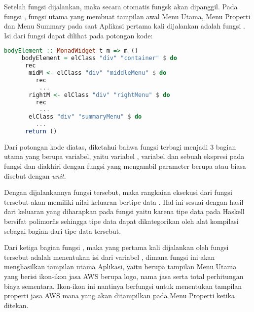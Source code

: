\documentclass[pi.tex]{subfile}
\begin{document}
   \hspace{5pt}Setelah fungsi  dijalankan, maka secara otomatis fungsk  akan dipanggil. Pada fungsi , fungsi utama yang membuat tampilan awal Menu Utama, Menu Properti dan Menu Summary pada saat Aplikasi pertama kali dijalankan adalah fungsi . Isi dari fungsi  dapat dilihat pada potongan kode:\\
   
   \begin{lstlisting}[language=Haskell]
     bodyElement :: MonadWidget t m => m ()
     bodyElement = elClass "div" "container" $ do
      rec
       midM <- elClass "div" "middleMenu" $ do
         rec
          ...
       rightM <- elClass "div" "rightMenu" $ do
         rec
          ...
       elClass "div" "summaryMenu" $ do
         ...
      return ()
   \end{lstlisting}

   \hspace{5pt}Dari potongan kode diatas, diketahui bahwa fungsi  terbagi menjadi 3 bagian utama yang berupa variabel, yaitu variabel , variabel  dan sebuah ekspresi pada fungsi  dan diakhiri dengan fungsi  yang mengambil parameter berupa \fhaskell{()} atau biasa disebut dengan \emph{unit}.

   \hspace{5pt}Dengan dijalankannya fungsi  tersebut, maka rangkaian eksekusi dari fungsi tersebut akan memiliki nilai keluaran bertipe data . Hal ini sesuai dengan hasil dari keluaran yang diharapkan pada fungsi  yaitu  karena tipe data  pada Haskell bersifat polimorfis sehingga tipe data  dapat dikategorikan oleh alat kompilasi sebagai bagian dari tipe data  tersebut.

   \hspace{5pt}Dari ketiga bagian fungsi , maka yang pertama kali dijalankan oleh fungsi tersebut adalah menentukan isi dari variabel , dimana fungsi ini akan menghasilkan tampilan utama Aplikasi, yaitu berupa tampilan Menu Utama yang berisi ikon-ikon jasa AWS berupa logo, nama jasa serta total perhitungan biaya sementara. Ikon-ikon ini nantinya berfungsi untuk menentukan tampilan properti jasa AWS mana yang akan ditampilkan pada Menu Properti ketika ditekan.
\end{document}
